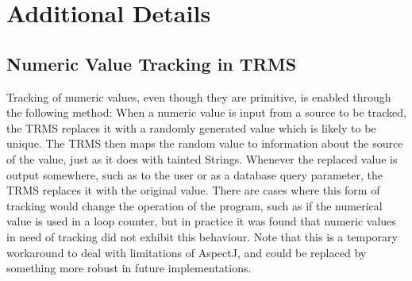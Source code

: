 \documentclass[msc,oneside]{ubcthesis}
\begin{document}
\section{Additional Details}

\subsection{Numeric Value Tracking in TRMS}
\label{sec:numtrack}
Tracking of numeric values, even though they are primitive, is enabled through the following method: When a numeric value is input from a source to be tracked, the TRMS replaces it with a randomly generated value which is likely to be unique. The TRMS then maps the random value to information about the source of the value, just as it does with tainted Strings. Whenever the replaced value is output somewhere, such as to the user or as a database query parameter, the TRMS replaces it with the original value. There are cases where this form of tracking would change the operation of the program, such as if the numerical value is used in a loop counter, but in practice it was found that numeric values in need of tracking did not exhibit this behaviour. Note that this is a temporary workaround to deal with limitations of AspectJ, and could be replaced by something more robust in future implementations.



%
\end{document}
